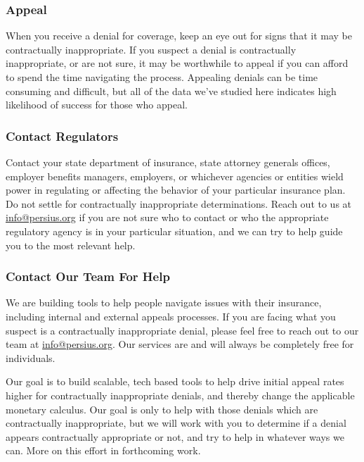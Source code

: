 \documentclass[12pt, a4paper,twoside,parskip=full]{report}
\theoremstyle{plain} %
\theoremstyle{definition} %
\theoremstyle{remark} %
\numberwithin{equation}{chapter}
\begin{document}
		\subsubsection{Appeal}
		
		When you receive a denial for coverage, keep an eye out for signs that it may be contractually inappropriate. If you
		suspect a denial is contractually inappropriate, or are not sure, it may be worthwhile to appeal if you can afford
		to spend the time navigating the process. Appealing denials can be time consuming and difficult, but all of the data
		we've studied here indicates high likelihood of success for those who appeal.
		
		\subsubsection{Contact Regulators}
		
		Contact your state department of insurance, state attorney generals offices, employer benefits managers, employers, 
		or whichever agencies or entities wield power in regulating or affecting the behavior of your particular insurance plan. 
		Do not settle for contractually inappropriate determinations. Reach out to us at \href{info@persius.org}{info@persius.org} if you are not sure who 
		to contact or who the appropriate regulatory agency is in your particular situation, and we can try to help guide you
		to the most relevant help.
		
		\subsubsection{Contact Our Team For Help}
		
		We are building tools to help people navigate issues with their insurance, including internal and external appeals processes. If you are facing what you suspect is a contractually inappropriate denial, please feel free to reach out to our team at \href{info@persius.org}{info@persius.org}. Our services are and will always be completely free for individuals.
		
		      Our goal is to build scalable, tech based tools to help drive initial appeal rates higher for contractually inappropriate denials,
		and thereby change the applicable monetary calculus.
		Our goal is only to help with those denials which are contractually inappropriate, but we will work with you to determine if a denial appears 
		contractually appropriate or not, and try to help in whatever ways we can. More on this effort in forthcoming work.
		
\end{document}
